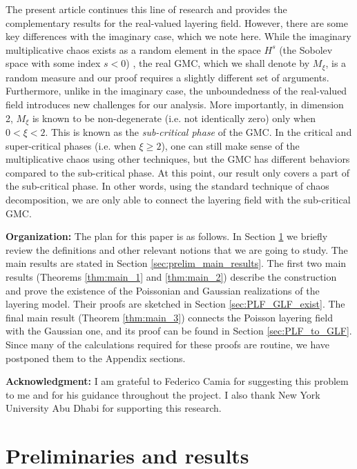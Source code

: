 \documentclass[a4paper, 11pt, reqno]{amsart}
\theoremstyle{definition} \newtheorem{defn}{Definition}[section]
\theoremstyle{remark} \newtheorem{rem}[defn]{Remark}
\theoremstyle{remark} \newtheorem*{rem*}{Remark}
\theoremstyle{plain} \newtheorem{thm}[defn]{Theorem}
\theoremstyle{plain} \newtheorem{lem}[defn]{Lemma}
\theoremstyle{plain} \newtheorem{prop}[defn]{Proposition}
\theoremstyle{plain} \newtheorem{cor}[defn]{Corollary}
\theoremstyle{remark} \newtheorem{exm}[defn]{\textbf{Example}}
\theoremstyle{remark} \newtheorem{exms}[defn]{\textbf{Examples}}
\theoremstyle{remark} \newtheorem*{bl}{}
\numberwithin{equation}{section} %
\begin{document}
    The present article continues this line of research and provides the complementary results for the real-valued layering field. However, there are some key differences with the imaginary case, which we note here. While the imaginary multiplicative chaos exists as a random element in the space $H^{s}$ (the Sobolev space with some index $s<0$) 
    \cite{jsw20}, the real GMC, which we shall denote by $M_{\xi}$, is a random measure and our proof requires a slightly different set of arguments. Furthermore, unlike in the imaginary case, the unboundedness of the real-valued field introduces new challenges for our analysis. More importantly, in dimension 2, $M_{\xi}$ is known to be non-degenerate (i.e. not identically zero) only when $0<\xi< 2$. This is known as the \textit{sub-critical phase} of the GMC. In the critical and super-critical phases (i.e. when $\xi\ge 2$), one can still make sense of the multiplicative chaos using other techniques, but the GMC has different behaviors compared to the sub-critical phase. At this point, our result only covers a part of the sub-critical phase. In other words, using the standard technique of chaos decomposition, we are only able to connect the layering field with the sub-critical GMC.   
    
    \textbf{Organization:} The plan for this paper is as follows. In Section \ref{sec:prelim} we briefly review the definitions and other relevant notions that we are going to study. The main results are stated in Section \ref{sec:prelim_main_results}. The first two main results (Theorems \ref{thm:main_1} and \ref{thm:main_2}) describe the construction and prove the existence of the Poissonian and Gaussian realizations of the layering model. Their proofs are sketched in Section \ref{sec:PLF_GLF_exist}. The final main result (Theorem \ref{thm:main_3}) connects the Poisson layering field with the Gaussian one, and its proof can be found in Section \ref{sec:PLF_to_GLF}. Since many of the calculations required for these proofs are routine, we have postponed them to the Appendix sections. 

    \textbf{Acknowledgment:} I am grateful to Federico Camia for suggesting this problem to me and for his guidance throughout the project. I also thank New York University Abu Dhabi for supporting this research.

    
    \section{Preliminaries and results}\label{sec:prelim}
    
\end{document}
